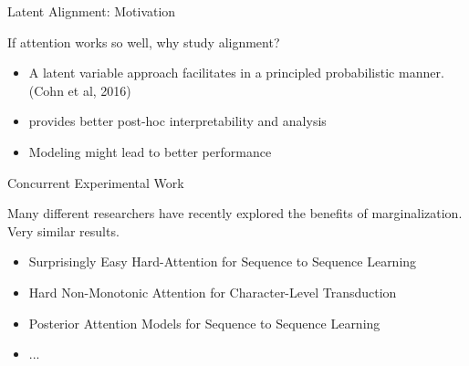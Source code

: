 


\begin{frame}{Latent Alignment: Motivation}

If attention works so well, why study alignment?

\begin{itemize}
    \item A latent variable approach  facilitates   in a principled probabilistic manner. (Cohn et al, 2016)
    \air
    \item {} provides better post-hoc interpretability and analysis
    \air
    \item Modeling  might lead to better performance
\end{itemize}
\end{frame}

\begin{frame}
  {Concurrent Experimental Work}

  Many different researchers have recently explored the
  benefits of marginalization. Very similar results.

  \begin{itemize}
  \item Surprisingly Easy Hard-Attention for Sequence to Sequence Learning
  \item Hard Non-Monotonic Attention for Character-Level Transduction
  \item Posterior Attention Models for Sequence to Sequence Learning
  \item ...
  \end{itemize}
\end{frame}

